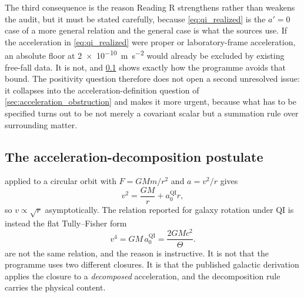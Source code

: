 \documentclass[11pt]{article}
\newcommand{\QI}{\mathrm{QI}}
\begin{document}
The third consequence is the reason Reading R strengthens rather than weakens the audit, but it must be stated carefully, because \cref{eq:qi_realized} is the \(a'=0\) case of a more general relation and the general case is what the sources use. If the acceleration in \cref{eq:qi_realized} were proper or laboratory-frame acceleration, an absolute floor at \SI{2e-10}{m.s^{-2}} would already be excluded by existing free-fall data. It is not, and \cref{sec:decomposition} shows exactly how the programme avoids that bound. The positivity question therefore does not open a second unresolved issue: it collapses into the acceleration-definition question of \cref{sec:acceleration_obstruction} and makes it more urgent, because what has to be specified turns out to be not merely a covariant scalar but a summation rule over surrounding matter.

\subsection{The acceleration-decomposition postulate}
\label{sec:decomposition}

 applied to a circular orbit with \(F=GMm/r^{2}\) and \(a=v^{2}/r\) gives
\begin{equation}
    v^{2}=\frac{GM}{r}+a_{0}^{\QI}r,
    \label{eq:closure_R_rotation}
\end{equation}
so \(v\propto\sqrt{r}\) asymptotically. The relation reported for galaxy rotation under QI is instead the flat Tully--Fisher form
\begin{equation}
    v^{4}=GM\,a_{0}^{\QI}=\frac{2GMc^{2}}{\Theta}.
    \label{eq:closure_G_rotation}
\end{equation}
 are not the same relation, and the reason is instructive. It is not that the programme uses two different closures. It is that the published galactic derivation applies the closure to a \emph{decomposed} acceleration, and the decomposition rule carries the physical content.
\end{document}
